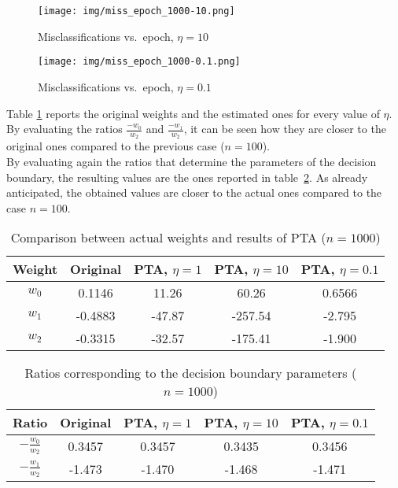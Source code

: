 \documentclass[12pt]{article}
\begin{document}
\begin{figure} [h]
    \begin{minipage}{0.45\linewidth}
        \centering
        \texttt{[image: img/miss\_epoch\_1000-10.png]}
        \caption{Misclassifications vs.\ epoch, $\eta=10$}
        \label{fig:miss-1000-10}
    \end{minipage}
    \hspace{0.5cm}
    \begin{minipage}{0.45\linewidth}
        \centering
        \texttt{[image: img/miss\_epoch\_1000-0.1.png]}
        \caption{Misclassifications vs.\ epoch, $\eta=0.1$}
        \label{fig:miss-1000-01}
    \end{minipage}
\end{figure}

Table \ref{tab:eta-1000} reports the original weights and the estimated ones for every value of $\eta$.
By evaluating the ratios $\frac{-w_0}{w_2}$ and $\frac{-w_1}{w_2}$, it can be seen how they are closer to the original ones compared to the previous case ($n=100$).\\
By evaluating again the ratios that determine the parameters of the decision boundary, the resulting values are the ones reported in table~\ref{tab:ratios}.
As already anticipated, the obtained values are closer to the actual ones compared to the case $n=100$.

\begin{table}[h]
    \centering
    \begin{tabular}{|c|c|c|c|c|}
        \hline
        Weight & \textbf{Original} & \textbf{PTA}, $\eta=1$ & \textbf{PTA}, $\eta=10$ & \textbf{PTA}, $\eta=0.1$ \\ 
        \hline
        \hline
        $w_0$ & 0.1146 & 11.26 & 60.26 & 0.6566 \\
        \hline
        $w_1$ & -0.4883 & -47.87 & -257.54 & -2.795 \\
        \hline
        $w_2$ & -0.3315 & -32.57 & -175.41 & -1.900 \\
        \hline
    \end{tabular}
    \caption{Comparison between actual weights and results of PTA ($n=1000$)}
    \label{tab:eta-1000}
\end{table}

\begin{table}[ht]
    \centering
    \begin{tabular}{|c|c|c|c|c|}
        \hline
        Ratio & \textbf{Original} & \textbf{PTA}, $\eta=1$ & \textbf{PTA}, $\eta=10$ & \textbf{PTA}, $\eta=0.1$ \\ 
        \hline
        \hline
        $-\frac{w_0}{w_2}$ & 0.3457 & 0.3457 & 0.3435 & 0.3456 \\
        \hline
        $-\frac{w_1}{w_2}$ & -1.473 & -1.470 & -1.468 & -1.471 \\
        \hline
    \end{tabular}
    \caption{Ratios corresponding to the decision boundary parameters ($n=1000$)}
    \label{tab:ratios}
\end{table}
\end{document}
